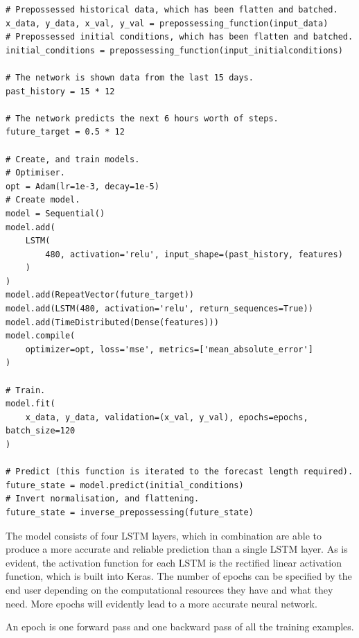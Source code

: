 \begin{verbatim}
# Prepossessed historical data, which has been flatten and batched.
x_data, y_data, x_val, y_val = prepossessing_function(input_data)
# Prepossessed initial conditions, which has been flatten and batched.
initial_conditions = prepossessing_function(input_initialconditions)

# The network is shown data from the last 15 days.
past_history = 15 * 12

# The network predicts the next 6 hours worth of steps.
future_target = 0.5 * 12

# Create, and train models.
# Optimiser.
opt = Adam(lr=1e-3, decay=1e-5)
# Create model.
model = Sequential()
model.add(
    LSTM(
        480, activation='relu', input_shape=(past_history, features)
    )
)
model.add(RepeatVector(future_target))
model.add(LSTM(480, activation='relu', return_sequences=True))
model.add(TimeDistributed(Dense(features)))
model.compile(
    optimizer=opt, loss='mse', metrics=['mean_absolute_error']
)

# Train.
model.fit(
    x_data, y_data, validation=(x_val, y_val), epochs=epochs, batch_size=120
)

# Predict (this function is iterated to the forecast length required).
future_state = model.predict(initial_conditions)
# Invert normalisation, and flattening.
future_state = inverse_prepossessing(future_state)
\end{verbatim}

The model consists of four LSTM layers, which in combination are able to produce a more accurate and reliable prediction than a single LSTM layer. As is evident, the activation function for each LSTM is the rectified linear activation function, which is built into Keras. The number of epochs can be specified by the end user depending on the computational resources they have and what they need. More epochs will evidently lead to a more accurate neural network.

\begin{definition}
An epoch is one forward pass and one backward pass of all the training examples.
\end{definition}
